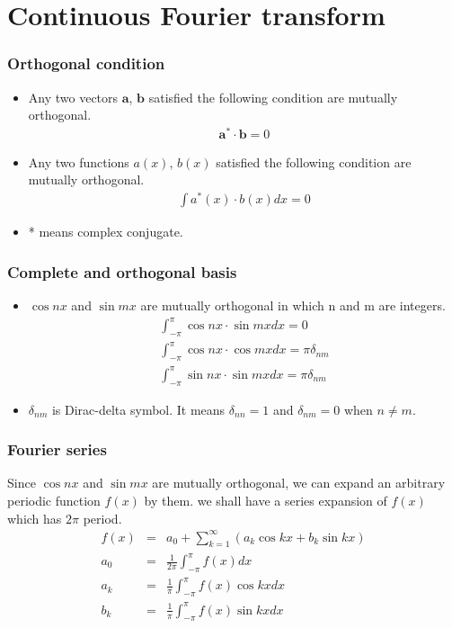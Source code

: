 \documentclass{beamer}
\begin{document}
\section{Continuous Fourier transform}
\begin{frame}
\frametitle{Orthogonal condition}
\begin{itemize}
\item Any two vectors $\mathbf{a}$, $\mathbf{b}$ satisfied the following condition are mutually orthogonal. \newline
\begin{eqnarray}
\mathbf{a}^* \cdot \mathbf{b} = 0
\label{eq:ortho_vec}
\end{eqnarray}
\item Any two functions $a(x)$, $b(x)$ satisfied the following condition are mutually orthogonal. \newline
\begin{eqnarray}
\int{a^*(x)} \cdot {b(x)} dx = 0
\label{eq:ortho_func}
\end{eqnarray}
\item * means complex conjugate. \newline
\end{itemize}
\end{frame}
\begin{frame}
\frametitle{Complete and orthogonal basis}
\begin{itemize}
\item $\cos nx $ and $\sin mx$ are mutually orthogonal in which n and m are integers.
\begin{eqnarray}
\int_{-\pi}^{\pi}{\cos nx} \cdot {\sin mx} dx = 0 \nonumber \\
\int_{-\pi}^{\pi}{\cos nx} \cdot {\cos mx} dx = \pi\delta_{nm} \nonumber \\
\int_{-\pi}^{\pi}{\sin nx} \cdot {\sin mx} dx = \pi\delta_{nm}
\end{eqnarray}
\item $\delta_{nm} $ is Dirac-delta symbol. It means $\delta_{nn} = 1$ and $\delta_{nm} = 0$ when $n \neq m$.
\end{itemize}
\end{frame}
\begin{frame}
\frametitle{Fourier series}
Since $\cos nx $ and $\sin mx$ are mutually orthogonal, we can expand an arbitrary periodic function $f(x)$ by them. we shall have a series expansion of $f(x)$ which has $2\pi$ period.
\begin{eqnarray}
f(x)&=&a_0 + \sum_{k=1}^{\infty} \left(a_k\cos kx + b_k \sin kx\right) \nonumber \\
a_0&=&\frac{1}{2\pi}\int_{-\pi}^{\pi}f(x) dx \nonumber \\
a_k&=&\frac{1}{\pi}\int_{-\pi}^{\pi}f(x) \cos kx dx \nonumber \\
b_k&=&\frac{1}{\pi}\int_{-\pi}^{\pi}f(x) \sin kx dx
\label{eq:fseries}
\end{eqnarray}
\end{frame}
\end{document}
